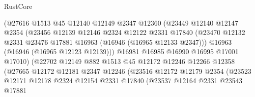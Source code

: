\begin{lexlean}{RustCore}
\begin{coremodule}
                            (@27616
                              @1513
                              @45
                              @12140
                              @12149
                              @2347
                              @12360
                              (@23449
                                @12140
                                @12147
                                @2354
                                (@23456
                                  @12139
                                  @12146
                                  @2324
                                  @12122
                                  @2331
                                  @17840
                                  (@23470
                                    @12132
                                    @2331
                                    @23476
                                    @17881
                                    @16963
                                    (@16946 (@16965 @12133 @2347)))
                                  @16963
                                  (@16946 (@16965 @12123 @12139)))
                                @16981
                                @16985
                                @16990
                                @16995
                                @17001
                                @17010)
                              (@22702
                                @12149
                                @882
                                @1513
                                @45
                                @12172
                                @12246
                                @12266
                                @12358
                                (@27665
                                  @12172
                                  @12181
                                  @2347
                                  @12246
                                  (@23516
                                    @12172
                                    @12179
                                    @2354
                                    (@23523
                                      @12171
                                      @12178
                                      @2324
                                      @12154
                                      @2331
                                      @17840
                                      (@23537
                                        @12164
                                        @2331
                                        @23543
                                        @17881

\end{coremodule}
\end{lexlean}
